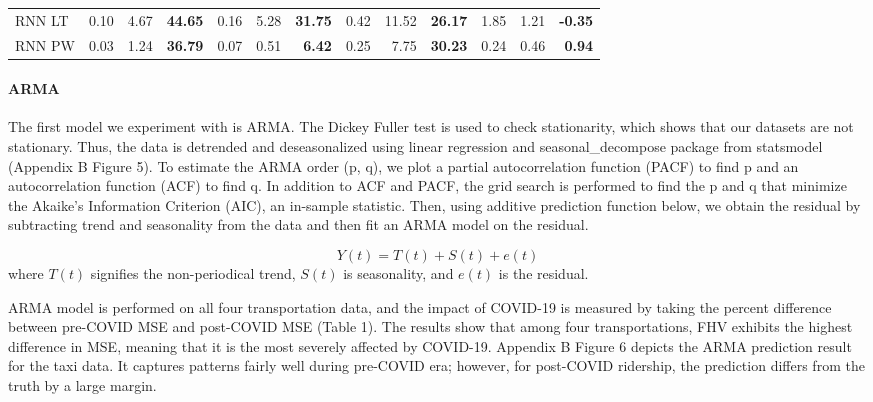 \documentclass{article}
\begin{document}
\begin{table}[h]
\begin{adjustbox}{width=\textwidth}
\begin{tabular}{@{}lrrrrrrrrrrrr@{}}
RNN LT                             & 0.10                             & 4.67                              & \textbf{44.65}                    & 0.16                             & 5.28                              & \textbf{31.75}                    & 0.42                             & 11.52                             & \textbf{26.17}                    & 1.85                             & 1.21                              & \textbf{-0.35}                    \\
RNN PW                             & 0.03                             & 1.24                              & \textbf{36.79}                    & 0.07                             & 0.51                              & \textbf{6.42}                     & 0.25                             & 7.75                              & \textbf{30.23}                    & 0.24                             & 0.46                              & \textbf{0.94}                     \\ \bottomrule
\end{tabular}
\end{adjustbox}
\textit{\small{}}
\end{table}


\paragraph{ARMA}
The first model we experiment with is ARMA. The Dickey Fuller test is used to check stationarity, which shows that our datasets are not stationary. Thus, the data is detrended and deseasonalized using linear regression and seasonal\_decompose package from statsmodel (Appendix B Figure 5). To estimate the ARMA order (p, q), we plot a partial autocorrelation function (PACF) to find p and an autocorrelation function (ACF) to find q. In addition to ACF and PACF, the grid search is performed to find the p and q that minimize the Akaike’s Information Criterion (AIC), an in-sample statistic. Then, using additive prediction function below, we obtain the residual by subtracting trend and seasonality from the data and then fit an ARMA model on the residual. 

$$Y(t) = T(t) + S(t) + e(t)$$ 	
where $T(t)$ signifies the non-periodical trend, $S(t)$ is seasonality, and $e(t)$ is the residual.

ARMA model is performed on all four transportation data, and the impact of COVID-19 is measured by taking the percent difference between pre-COVID MSE and post-COVID MSE (Table 1). The results show that among four transportations, FHV exhibits the highest difference in MSE, meaning that it is the most severely affected by COVID-19. Appendix B Figure 6 depicts the ARMA prediction result for the taxi data. It captures patterns fairly well during pre-COVID era; however, for post-COVID ridership, the prediction differs from the truth by a large margin. 
\end{document}
